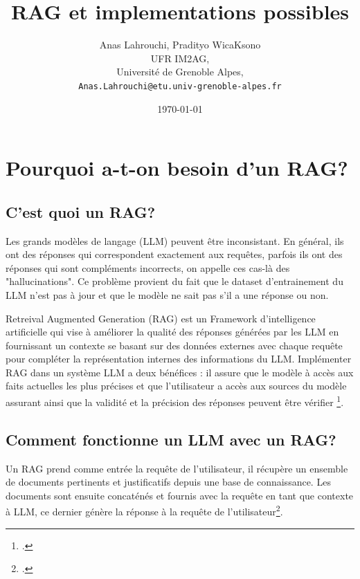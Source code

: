 \documentclass{article}
\title{RAG et implementations possibles}
\author{Anas Lahrouchi, Pradityo WicaKsono\\
   UFR IM2AG,\\
   Université de Grenoble Alpes,\\
   \texttt{Anas.Lahrouchi@etu.univ-grenoble-alpes.fr}}
\date{\today}
\begin{document}
\maketitle
\newpage

\section{Pourquoi a-t-on besoin d'un RAG?}

\subsection{C'est quoi un RAG?}

Les grands modèles de langage (LLM) peuvent être inconsistant. En général, ils ont des réponses qui correspondent exactement aux requêtes, 
parfois ils ont des réponses qui sont compléments incorrects, on appelle ces cas-là des "hallucinations". Ce problème provient 
du fait que le dataset d'entrainement du LLM n'est pas à jour et que le modèle ne sait pas s'il a une réponse ou non.

Retreival Augmented Generation (RAG) est un Framework d'intelligence artificielle qui vise à améliorer la qualité des réponses générées par les LLM 
en fournissant un contexte se basant sur des données externes avec chaque requête pour compléter la représentation internes des informations du LLM. 
Implémenter RAG dans un système LLM a deux bénéfices : il assure que le modèle à accès aux faits actuelles les plus précises et que l'utilisateur a 
accès aux sources du modèle assurant ainsi que la validité et la précision des réponses peuvent être vérifier \footcite{ibmragarticle23}.

\subsection{Comment fonctionne un LLM avec un RAG?}


Un RAG prend comme entrée la requête de l'utilisateur, il récupère un ensemble de documents pertinents et justificatifs depuis une base de connaissance. 
Les documents sont ensuite concaténés et fournis avec la requête en tant que contexte à LLM, ce dernier génère la réponse à la requête de l'utilisateur\footcite{heikohotz23}.
\end{document}
